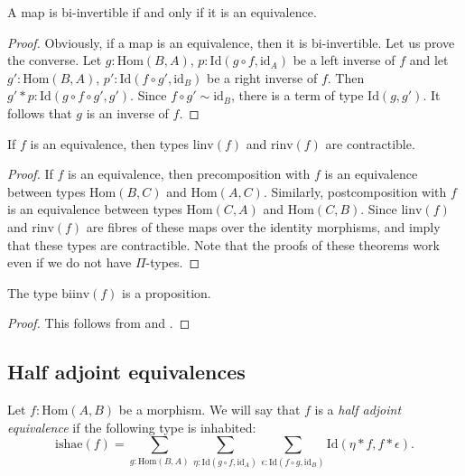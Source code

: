\documentclass[reqno]{mscs}
\newcommand{\fs}[1]{\mathrm{#1}}
\newcommand{\Hom}{\fs{Hom}}
\newcommand{\Id}{\fs{Id}}
\newcommand{\id}{\fs{id}}
\numberwithin{figure}{section}
\begin{document}
\begin{prop}
A map is bi-invertible if and only if it is an equivalence.
\end{prop}
\begin{proof}
Obviously, if a map is an equivalence, then it is bi-invertible.
Let us prove the converse.
Let $g : \Hom(B,A)$, $p : \Id(g \circ f, \id_A)$ be a left inverse of $f$ and let $g' : \Hom(B,A)$, $p' : \Id(f \circ g', \id_B)$ be a right inverse of $f$.
Then $g' * p : \Id(g \circ f \circ g', g')$.
Since $f \circ g' \sim \id_B$, there is a term of type $\Id(g,g')$.
It follows that $g$ is an inverse of $f$.
\end{proof}

\begin{lem}
If $f$ is an equivalence, then types $\fs{linv}(f)$ and $\fs{rinv}(f)$ are contractible.
\end{lem}
\begin{proof}
If $f$ is an equivalence, then precomposition with $f$ is an equivalence between types $\Hom(B,C)$ and $\Hom(A,C)$.
Similarly, postcomposition with $f$ is an equivalence between types $\Hom(C,A)$ and $\Hom(C,B)$.
Since $\fs{linv}(f)$ and $\fs{rinv}(f)$ are fibres of these maps over the identity morphisms, \cite[Theorem~4.2.3]{hottbook} and \cite[Theorem~4.2.6]{hottbook} imply that these types are contractible.
Note that the proofs of these theorems work even if we do not have $\Pi$-types.
\end{proof}

\begin{prop}
The type $\fs{biinv}(f)$ is a proposition.
\end{prop}
\begin{proof}
This follows from  and .
\end{proof}

\subsection{Half adjoint equivalences}

Let $f : \Hom(A,B)$ be a morphism.
We will say that $f$ is a \emph{half adjoint equivalence} if the following type is inhabited:
\[ \fs{ishae}(f) = \sum_{g : \Hom(B,A)} \sum_{\eta : \Id(g \circ f, \id_A)} \sum_{\epsilon : \Id(f \circ g, \id_B)} \Id(\eta * f, f * \epsilon). \]
\end{document}
